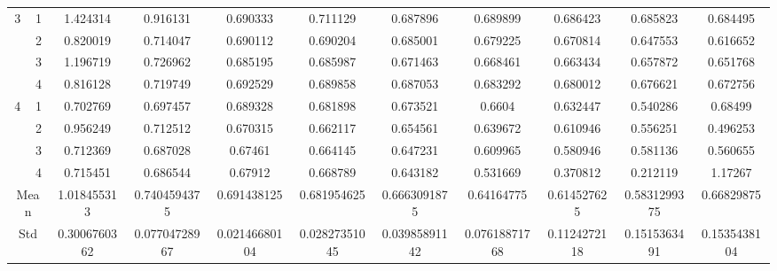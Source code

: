 \documentclass[draft,dvipsnames]{drexel-thesis}
\begin{document}
\begin{thesis}
\begin{table}[!t]
{\begin{tabular}{|c|c|c|c|c|c|c|c|c|c|c|}
\multirow{4}{*}{3}    & 1                   & 1.424314     & 0.916131      & 0.690333      & 0.711129      & 0.687896      & 0.689899      & 0.686423     & 0.685823     & 0.684495     \\ \cline{2-11} 
                      & 2                   & 0.820019     & 0.714047      & 0.690112      & 0.690204      & 0.685001      & 0.679225      & 0.670814     & 0.647553     & 0.616652     \\ \cline{2-11} 
                      & 3                   & 1.196719     & 0.726962      & 0.685195      & 0.685987      & 0.671463      & 0.668461      & 0.663434     & 0.657872     & 0.651768     \\ \cline{2-11} 
                      & 4                   & 0.816128     & 0.719749      & 0.692529      & 0.689858      & 0.687053      & 0.683292      & 0.680012     & 0.676621     & 0.672756     \\ \hline
\multirow{4}{*}{4}    & 1                   & 0.702769     & 0.697457      & 0.689328      & 0.681898      & 0.673521      & 0.6604        & 0.632447     & 0.540286     & 0.68499      \\ \cline{2-11} 
                      & 2                   & 0.956249     & 0.712512      & 0.670315      & 0.662117      & 0.654561      & 0.639672      & 0.610946     & 0.556251     & 0.496253     \\ \cline{2-11} 
                      & 3                   & 0.712369     & 0.687028      & 0.67461       & 0.664145      & 0.647231      & 0.609965      & 0.580946     & 0.581136     & 0.560655     \\ \cline{2-11} 
                      & 4                   & 0.715451     & 0.686544      & 0.67912       & 0.668789      & 0.643182      & 0.531669      & 0.370812     & 0.212119     & 1.17267      \\ \hline
\multicolumn{2}{|c|}{Mean}                  & 1.018455313  & 0.7404594375  & 0.691438125   & 0.681954625   & 0.6663091875  & 0.64164775    & 0.614527625  & 0.5831299375 & 0.66829875   \\ \hline
\multicolumn{2}{|c|}{Std}                   & 0.3006760362 & 0.07704728967 & 0.02146680104 & 0.02827351045 & 0.03985891142 & 0.07618871768 & 0.1124272118 & 0.1515363491 & 0.1535438104 \\ \hline
\end{tabular}}
\end{table}


\end{thesis}
\end{document}
